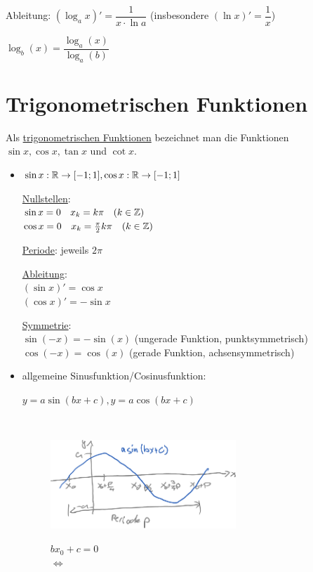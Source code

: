 
Ableitung: $(\log_ax)'=\dfrac{1}{x\cdot\ln a}$ (insbesondere $(\ln x)'=\dfrac{1}{x}$)

$\log_b(x) = \dfrac{\log_a(x)}{\log_a(b)}$

\clearpage
\section{Trigonometrischen Funktionen}
\Def Als \ul{trigonometrischen Funktionen} bezeichnet man die Funktionen $\sin x, \cos x, \tan x$ und $\cot x$.
\begin{itemize}
	\item $\sin x:\mathbb{R}\to[-1;1],\cos x:\mathbb{R}\to[-1;1]$
	
	\ul{Nullstellen}:\\
	$\sin x=0\quad x_k=k\pi\quad(k\in\mathbb{Z})$\\
	$\cos x=0\quad x_k=\frac{\pi}{2}k\pi\quad(k\in\mathbb{Z})$
	
	\ul{Periode}: jeweils $2\pi$
	
	\ul{Ableitung}:\\
	$(\sin x)'= \cos x$\\
	$(\cos x)'= -\sin x$
	
	\ul{Symmetrie}:\\
	$\sin(-x)=-\sin(x)$ (ungerade Funktion, punktsymmetrisch)\\
	$\cos(-x)=\cos(x)$ (gerade Funktion, achsensymmetrisch)\\
	
	\clearpage
	\item allgemeine Sinusfunktion/Cosinusfunktion:
	
	$y=a\sin(bx+c), y=a\cos(bx+c)$
	
	\begin{figure}[h!]
		\\
		\begin{minipage}{0.48\linewidth}
			\centering\includegraphics[width=7cm]{Bilder/195}
			\caption{}
		\end{minipage}
		\begin{minipage}{0.48\linewidth}
			$bx_0+c=0$\\
			$\Leftrightarrow$
			

\end{minipage}
\end{figure}
\end{itemize}
